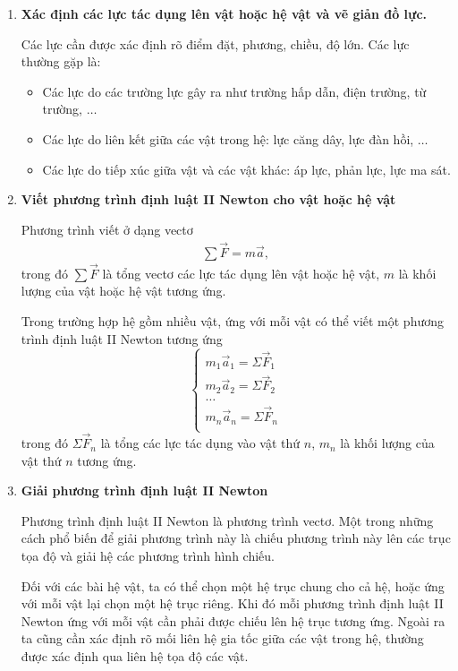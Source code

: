 \begin{enumerate}[label=\textbf{\arabic*}.]
	\item \textbf{Xác định các lực tác dụng lên vật hoặc hệ vật và vẽ giản đồ lực.}
	
	Các lực cần được xác định rõ điểm đặt, phương, chiều, độ lớn. Các lực thường gặp là: 
	\begin{itemize}
		\item Các lực do các trường lực gây ra như trường hấp dẫn, điện trường, từ trường, $\ldots$
		\item Các lực do liên kết giữa các vật trong hệ: lực căng dây, lực đàn hồi, $\ldots$
		\item Các lực do tiếp xúc giữa vật và các vật khác: áp lực, phản lực, lực ma sát.
	\end{itemize}
	\item \textbf{Viết phương trình định luật II Newton cho vật hoặc hệ vật }
	
	Phương trình viết ở dạng vectơ 
	\begin{align}
		\sum\vec{F}=m\vec{a},
	\end{align}
	trong đó $\sum\vec{F}$ là tổng vectơ các lực tác dụng lên vật hoặc hệ vật, $m$ là khối lượng của vật hoặc hệ vật tương ứng. 
	
	Trong trường hợp hệ gồm nhiều vật, ứng với mỗi vật có thể viết một phương trình định luật II Newton tương ứng
	$$\begin{cases}
		m_1 \vec{a}_1 = \Sigma \vec{F}_1\\
		m_2 \vec{a}_2 = \Sigma \vec{F}_2\\
		\ldots\\
		m_n \vec{a}_n = \Sigma \vec{F}_n\\
	\end{cases}$$
	trong đó  $\Sigma \vec{F}_n$ là tổng các lực tác dụng vào vật thứ $n$, $m_n$ là khối lượng của vật thứ $n$ tương ứng. 
	
	\item \textbf{Giải phương trình định luật II Newton }
	
	Phương trình định luật II Newton là phương trình vectơ. Một trong những cách phổ biến để giải phương trình này là chiếu phương trình này lên các trục tọa độ và giải hệ các phương trình hình chiếu. 
	
	Đối với các bài hệ vật, ta có thể chọn một hệ trục chung cho cả hệ, hoặc ứng với mỗi vật lại chọn một hệ trục riêng. Khi đó mỗi phương trình định luật II Newton ứng với mỗi vật cần phải được chiếu lên hệ trục tương ứng. Ngoài ra ta cũng cần xác định rõ mối liên hệ gia tốc giữa các vật trong hệ, thường được xác định qua liên hệ tọa độ các vật. 
\end{enumerate}

